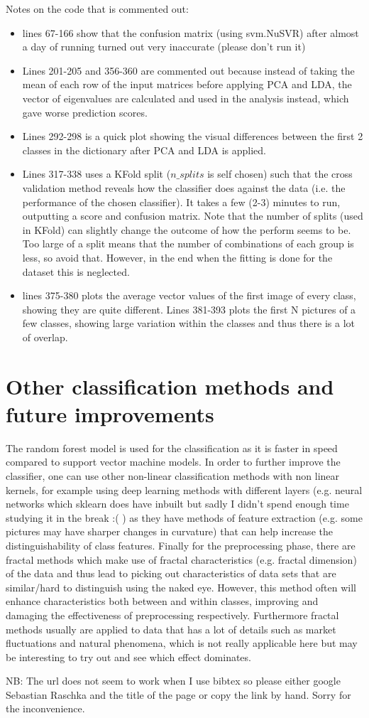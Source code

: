 \documentclass[11pt, oneside]{article}   	%
\begin{document}
Notes on the code that is commented out:
\begin{itemize}
\item lines 67-166 show that the confusion matrix (using svm.NuSVR) after almost a day of running turned out very inaccurate (please don't run it)
\item Lines 201-205 and 356-360 are commented out because instead of taking the mean of each row of the input matrices before applying PCA and LDA, the vector of eigenvalues are calculated and used in the analysis instead, which gave worse prediction scores.
\item Lines 292-298 is a quick plot showing the visual differences between the first 2 classes in the dictionary after PCA and LDA is applied.
\item Lines 317-338 uses a KFold split ($n\_splits$ is self chosen) such that the cross validation method reveals how the classifier does against the data (i.e. the performance of the chosen classifier). It takes a few (2-3) minutes to run, outputting a score and confusion matrix. Note that the number of splits (used in KFold) can slightly change the outcome of how the perform seems to be. Too large of a split means that the number of combinations of each group is less, so avoid that. However, in the end when the fitting is done for the dataset this is neglected. 
\item lines 375-380 plots the average vector values of the first image of every class, showing they are quite different. Lines 381-393 plots the first N pictures of a few classes, showing large variation within the classes and thus there is a lot of overlap.
\end{itemize}

\section{Other classification methods and future improvements}
The random forest model is used for the classification as it is faster in speed compared to support vector machine models. In order to further improve the classifier, one can use other non-linear classification methods with non linear kernels, for example using deep learning methods with different layers (e.g. neural networks which sklearn does have inbuilt but sadly I didn't spend enough time studying it in the break :( ) as they have methods of feature extraction (e.g. some pictures may have sharper changes in curvature) that can help increase the distinguishability of class features. Finally for the preprocessing phase, there are fractal methods which make use of fractal characteristics (e.g. fractal dimension) of the data and thus lead to picking out characteristics of data sets that are similar/hard to distinguish using the naked eye. However, this method often will enhance characteristics both between and within classes, improving and damaging the effectiveness of preprocessing respectively. Furthermore fractal methods usually are applied to  data that has a lot of details such as market fluctuations and natural phenomena, which is not really applicable here but may be interesting to try out and see which effect dominates.



NB: The url does not seem to work when I use bibtex so please either google Sebastian Raschka and the title of the page or copy the link by hand. Sorry for the inconvenience.
\end{document}

